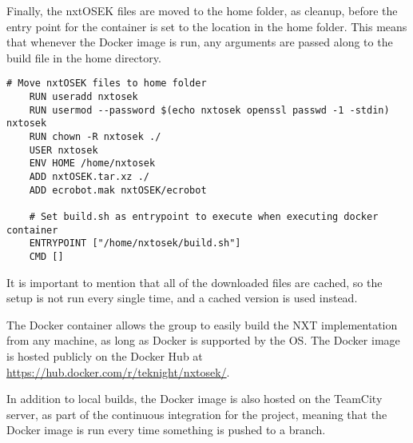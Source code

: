 Finally, the nxtOSEK files are moved to the home folder, as cleanup, before the entry point for the container is set to the location in the home folder.
This means that whenever the Docker image is run, any arguments are passed along to the build file in the home directory.

\begin{lstlisting}[language=docker,label={lst:dockerimplementation4},caption={Reee}]   
    # Move nxtOSEK files to home folder
    RUN useradd nxtosek
    RUN usermod --password $(echo nxtosek openssl passwd -1 -stdin) nxtosek
    RUN chown -R nxtosek ./
    USER nxtosek
    ENV HOME /home/nxtosek
    ADD nxtOSEK.tar.xz ./
    ADD ecrobot.mak nxtOSEK/ecrobot
    
    # Set build.sh as entrypoint to execute when executing docker container
    ENTRYPOINT ["/home/nxtosek/build.sh"]
    CMD []    
\end{lstlisting}
It is important to mention that all of the downloaded files are cached, so the setup is not run every single time, and a cached version is used instead.

The Docker container allows the group to easily build the NXT implementation from any machine, as long as Docker is supported by the OS.
The Docker image is hosted publicly on the Docker Hub at \url{https://hub.docker.com/r/teknight/nxtosek/}.

In addition to local builds, the Docker image is also hosted on the TeamCity server, as part of the continuous integration for the project, meaning that the Docker image is run every time something is pushed to a branch.


